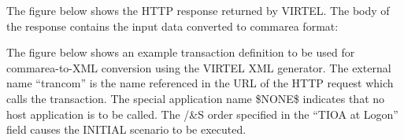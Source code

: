 \documentclass[letterpaper,10pt,english]{sphinxmanual}
\begin{document}

The figure below shows the HTTP response returned by VIRTEL. The body of the response contains the input data converted to commarea format:

\begin{sphinxVerbatim}[commandchars=\\\{\}]
  
 
      
 
 
 
\end{sphinxVerbatim}



The figure below shows an example transaction definition to be used for commarea-to-XML conversion using the
VIRTEL XML generator. The external name “trancom” is the name referenced in the URL of the HTTP request which
calls the transaction. The special application name \$NONE\$ indicates that no host application is to be called. The /\&S
order specified in the “TIOA at Logon” field causes the INITIAL scenario {\hyperref[\detokenize{User_Guide:v457ug-sconvpla}]{}} to be executed.
\end{document}
